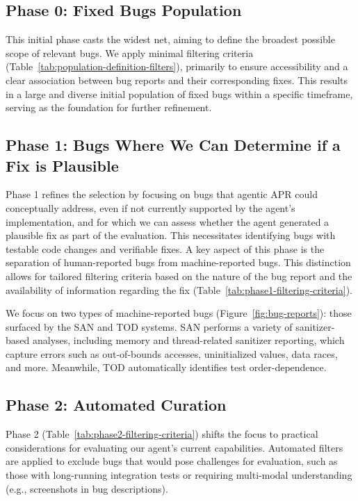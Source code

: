 \subsection{Phase 0: Fixed Bugs Population}

This initial phase casts the widest net, aiming to define the broadest possible scope of relevant bugs. We apply minimal filtering criteria (Table~\ref{tab:population-definition-filters}), primarily to ensure accessibility and a clear association between bug reports and their corresponding fixes. This results in a large and diverse initial population of fixed bugs within a specific timeframe, serving as the foundation for further refinement.




\subsection{Phase 1: Bugs Where We Can Determine if a Fix is Plausible
}
Phase 1 refines the selection by focusing on bugs that agentic APR could conceptually address, even if not currently supported by the agent's implementation, and for which we can assess whether the agent generated a plausible fix as part of the evaluation. This necessitates identifying bugs with testable code changes and verifiable fixes. A key aspect of this phase is the separation of human-reported bugs from machine-reported bugs. This distinction allows for tailored filtering criteria based on the nature of the bug report and the availability of information regarding the fix (Table~\ref{tab:phase1-filtering-criteria}).

We focus on two types of machine-reported bugs (Figure~\ref{fig:bug-reports}): those surfaced by the SAN and TOD systems.
SAN performs a variety of sanitizer-based analyses, including memory and thread-related sanitizer reporting, which capture errors such as out-of-bounds accesses, uninitialized values, data races, and more.
Meanwhile, TOD automatically identifies test order-dependence. 




\subsection{Phase 2: Automated Curation}
Phase 2 (Table~\ref{tab:phase2-filtering-criteria}) shifts the focus to practical considerations for evaluating our agent's current capabilities. Automated filters are applied to exclude bugs that would pose challenges for evaluation, such as those with long-running integration tests or requiring multi-modal understanding (e.g., screenshots in bug descriptions).

